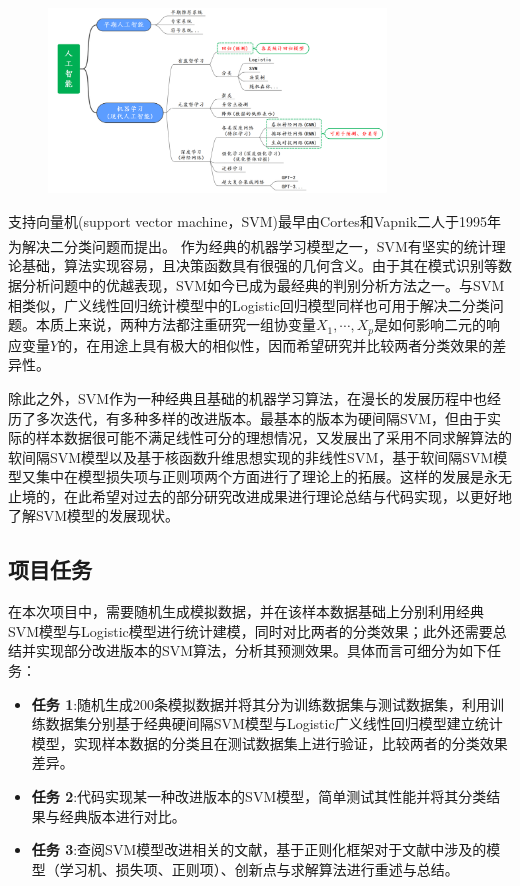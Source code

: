 \documentclass[12pt]{article}  %
\newcommand{\upcite}[1]{\textsuperscript{\textsuperscript{\cite{#1}}}}
\begin{document}
\begin{figure}[H]
	\centering
	\includegraphics[width=0.8\textwidth]{1.png}
\end{figure}

支持向量机(support vector machine，SVM)最早由Cortes和Vapnik二人于1995年为解决二分类问题而提出\upcite{1}。 作为经典的机器学习模型之一，SVM有坚实的统计理论基础，算法实现容易，且决策函数具有很强的几何含义。由于其在模式识别等数据分析问题中的优越表现，SVM如今已成为最经典的判别分析方法之一。与SVM相类似，广义线性回归统计模型中的Logistic回归模型同样也可用于解决二分类问题。本质上来说，两种方法都注重研究一组协变量$X_1,⋯,X_p$是如何影响二元的响应变量$Y$的，在用途上具有极大的相似性，因而希望研究并比较两者分类效果的差异性。

除此之外，SVM作为一种经典且基础的机器学习算法，在漫长的发展历程中也经历了多次迭代，有多种多样的改进版本。最基本的版本为硬间隔SVM，但由于实际的样本数据很可能不满足线性可分的理想情况，又发展出了采用不同求解算法的软间隔SVM模型以及基于核函数升维思想实现的非线性SVM，基于软间隔SVM模型又集中在模型损失项与正则项两个方面进行了理论上的拓展。这样的发展是永无止境的，在此希望对过去的部分研究改进成果进行理论总结与代码实现，以更好地了解SVM模型的发展现状。

\subsection{项目任务}	

在本次项目中，需要随机生成模拟数据，并在该样本数据基础上分别利用经典SVM模型与Logistic模型进行统计建模，同时对比两者的分类效果；此外还需要总结并实现部分改进版本的SVM算法，分析其预测效果。具体而言可细分为如下任务：
\begin{itemize}
	\setlength{\parsep}{0ex} %
	\setlength{\topsep}{2ex} %
	\setlength{\itemsep}{1ex} %
	\item \textbf{任务 1}:随机生成200条模拟数据并将其分为训练数据集与测试数据集，利用训练数据集分别基于经典硬间隔SVM模型与Logistic广义线性回归模型建立统计模型，实现样本数据的分类且在测试数据集上进行验证，比较两者的分类效果差异。		
	\item \textbf{任务 2}:代码实现某一种改进版本的SVM模型，简单测试其性能并将其分类结果与经典版本进行对比。
	\item \textbf{任务 3}:查阅SVM模型改进相关的文献，基于正则化框架对于文献中涉及的模型（学习机、损失项、正则项）、创新点与求解算法进行重述与总结。
\end{itemize}
\end{document}
